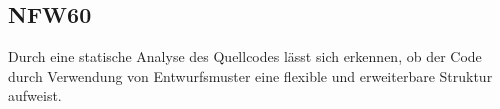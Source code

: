 \subsection*{NFW60}

Durch eine \gls{statische Analyse} des \Gls{Quellcode}s lässt sich erkennen, ob der Code durch Verwendung von Entwurfsmuster eine flexible und erweiterbare Struktur aufweist.
